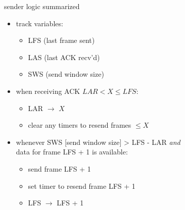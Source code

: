 \begin{frame}{sender logic summarized}
\begin{itemize}
\item track variables:
    \begin{itemize}
    \item LFS (last frame sent)
    \item LAS (last ACK recv'd)
    \item SWS (send window size)
    \end{itemize}
\item when receiving ACK $LAR < X \le LFS$:
    \begin{itemize}
    \item LAR $\rightarrow$ $X$
    \item clear any timers to resend frames $\le X$
    \end{itemize}
\item whenever SWS [send window size] > LFS - LAR \textit{and} \\
    data for frame LFS + 1 is available:
    \begin{itemize}
    \item send frame LFS + 1
    \item set timer to resend frame LFS + 1
    \item LFS $\rightarrow$ LFS + 1
    \end{itemize}
\end{itemize}
\end{frame}
